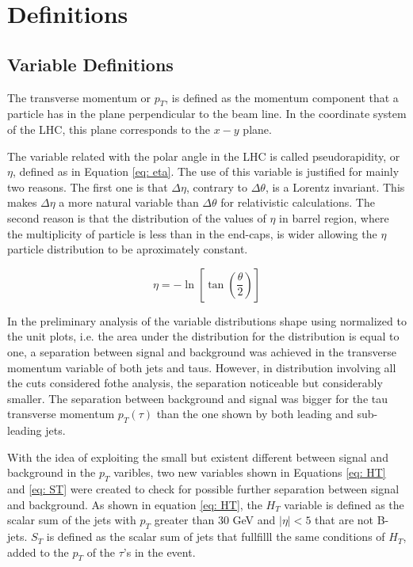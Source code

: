 \section{Definitions} \label{sec:definitions}

\subsection{Variable Definitions}

The transverse momentum or $p_{T}$, is defined as the momentum component that a particle has in the plane perpendicular to the beam line. In the coordinate system of the LHC, this plane corresponds to the $x-y$ plane.

The variable related with the polar angle in the LHC is called pseudorapidity, or $\eta$, defined as in Equation \ref{eq: eta}. The use of this variable is justified for mainly two reasons. The first one is that $\Delta \eta$, contrary to $\Delta \theta$, is a Lorentz invariant. This makes $\Delta \eta$ a more natural variable than $\Delta \theta$ for relativistic calculations. The second reason is that the distribution of the values of $\eta$ in barrel region, where the multiplicity of particle is less than in the end-caps, is wider allowing the $\eta$ particle distribution to be aproximately constant.

\begin{equation}
 \eta = -\ln\left[\tan\left(\frac{\theta}{2}\right)\right]
 \label{eq: eta}
\end{equation}

In the preliminary analysis of the variable distributions shape using normalized to the unit plots, i.e. the area under the distribution for the distribution is equal to one, a separation between signal and background was achieved in the transverse momentum variable of both jets and taus. However, in distribution involving all the cuts considered fothe analysis, the separation noticeable but considerably smaller. The separation between background and signal was bigger for the tau transverse momentum $p_{T}(\tau)$ than the one shown by both leading and sub-leading jets.

With the idea of exploiting the small but existent different between signal and background in the $p_{T}$ varibles, two new variables shown in Equations \ref{eq: HT} and \ref{eq: ST} were created to check for possible further separation between signal and background. As shown in equation \ref{eq: HT}, the $H_{T}$ variable is defined as the scalar sum of the jets with $p_{T}$ greater than 30 GeV and $|\eta| < 5$ that are not B-jets. $S_{T}$ is defined as the scalar sum of jets that fullfilll the same conditions of $H_{T}$, added to the $p_{T}$ of the $\tau$'s in the event.

